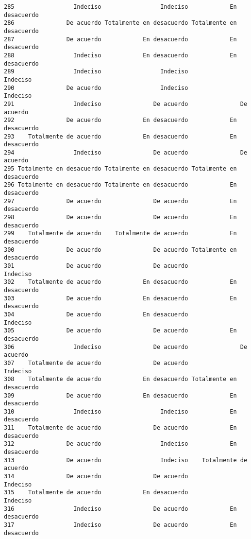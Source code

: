 \documentclass[
  letterpaper,
  DIV=11,
  numbers=noendperiod]{scrartcl}
\begin{document}
\begin{verbatim}
285                 Indeciso                 Indeciso            En desacuerdo
286               De acuerdo Totalmente en desacuerdo Totalmente en desacuerdo
287               De acuerdo            En desacuerdo            En desacuerdo
288                 Indeciso            En desacuerdo            En desacuerdo
289                 Indeciso                 Indeciso                 Indeciso
290               De acuerdo                 Indeciso                 Indeciso
291                 Indeciso               De acuerdo               De acuerdo
292               De acuerdo            En desacuerdo            En desacuerdo
293    Totalmente de acuerdo            En desacuerdo            En desacuerdo
294                 Indeciso               De acuerdo               De acuerdo
295 Totalmente en desacuerdo Totalmente en desacuerdo Totalmente en desacuerdo
296 Totalmente en desacuerdo Totalmente en desacuerdo            En desacuerdo
297               De acuerdo               De acuerdo            En desacuerdo
298               De acuerdo               De acuerdo            En desacuerdo
299    Totalmente de acuerdo    Totalmente de acuerdo            En desacuerdo
300               De acuerdo               De acuerdo Totalmente en desacuerdo
301               De acuerdo               De acuerdo                 Indeciso
302    Totalmente de acuerdo            En desacuerdo            En desacuerdo
303               De acuerdo            En desacuerdo            En desacuerdo
304               De acuerdo            En desacuerdo                 Indeciso
305               De acuerdo               De acuerdo            En desacuerdo
306                 Indeciso               De acuerdo               De acuerdo
307    Totalmente de acuerdo               De acuerdo                 Indeciso
308    Totalmente de acuerdo            En desacuerdo Totalmente en desacuerdo
309               De acuerdo            En desacuerdo            En desacuerdo
310                 Indeciso                 Indeciso            En desacuerdo
311    Totalmente de acuerdo               De acuerdo            En desacuerdo
312               De acuerdo                 Indeciso            En desacuerdo
313               De acuerdo                 Indeciso    Totalmente de acuerdo
314               De acuerdo               De acuerdo                 Indeciso
315    Totalmente de acuerdo            En desacuerdo                 Indeciso
316                 Indeciso               De acuerdo            En desacuerdo
317                 Indeciso               De acuerdo            En desacuerdo

\end{verbatim}
\end{document}
